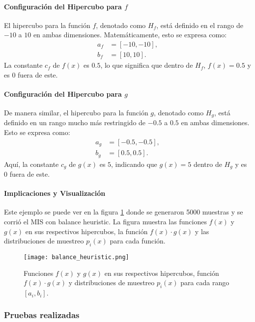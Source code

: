 \documentclass{article}
\begin{document}
\paragraph{Configuración del Hipercubo para \( f \)}
El hipercubo para la función \( f \), denotado como \( H_f \), está definido en el rango de \(-10\) a \(10\) en ambas dimensiones. Matemáticamente, esto se expresa como:
\begin{align*}
    a_f &= [-10, -10], \\
    b_f &= [10, 10].
\end{align*}
La constante \( c_f \) de \( f(x) \) es \( 0.5 \), lo que significa que dentro de \( H_f \), \( f(x) = 0.5 \) y es \( 0 \) fuera de este.

\paragraph{Configuración del Hipercubo para \( g \)}
De manera similar, el hipercubo para la función \( g \), denotado como \( H_g \), está definido en un rango mucho más restringido de \(-0.5\) a \(0.5\) en ambas dimensiones. Esto se expresa como:
\begin{align*}
    a_g &= [-0.5, -0.5], \\
    b_g &= [0.5, 0.5].
\end{align*}
Aquí, la constante \( c_g \) de \( g(x) \) es \( 5 \), indicando que \( g(x) = 5 \) dentro de \( H_g \) y es \( 0 \) fuera de este.

\paragraph{Implicaciones y Visualización}
Este ejemplo se puede ver en la figura \ref{fig:mis3} donde se generaron 5000 muestras y se corrió el MIS con balance heuristic.
La figura muestra las funciones \( f(x) \) y \( g(x) \) en sus respectivos hipercubos, la función \( f(x) \cdot g(x) \) y las distribuciones de muestreo \( p_{i}(x) \) para cada función.

\begin{figure}[H]
\texttt{[image: balance\_heuristic.png]}
\caption{Funciones \( f(x) \) y \( g(x) \) en sus respectivos hipercubos, función \( f(x) \cdot g(x) \) y distribuciones de muestreo \( p_{i}(x) \) para cada rango \( [a_{i}, b_{i}] \).}
\label{fig:mis3}
\end{figure}

\subsubsection{Pruebas realizadas}
\end{document}

